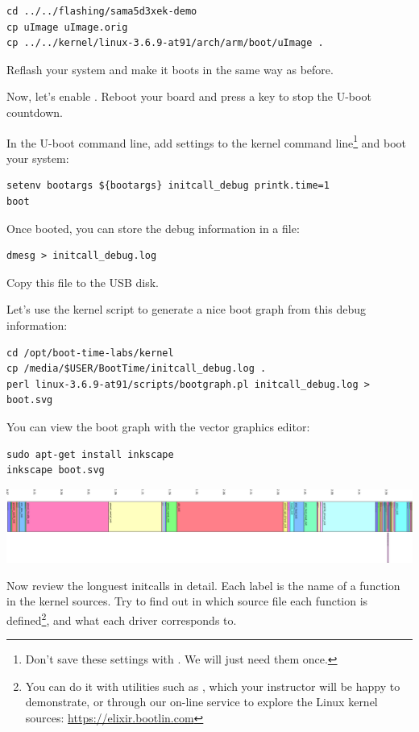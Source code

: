 \begin{verbatim}
cd ../../flashing/sama5d3xek-demo
cp uImage uImage.orig
cp ../../kernel/linux-3.6.9-at91/arch/arm/boot/uImage .
\end{verbatim}

Reflash your system and make it boots in the same way as before.

Now, let's enable . Reboot your board and press
a key to stop the U-boot countdown.

In the U-boot command line, add settings to the kernel command
line\footnote{Don't save these settings with . We
will just need them once.}
and boot your system:
\begin{verbatim}
setenv bootargs ${bootargs} initcall_debug printk.time=1
boot
\end{verbatim}

Once booted, you can store the debug information in a file:

\begin{verbatim}
dmesg > initcall_debug.log
\end{verbatim}

Copy this file to the USB disk.

Let's use the kernel script to generate a nice boot graph
from this debug information:

\begin{verbatim}
cd /opt/boot-time-labs/kernel
cp /media/$USER/BootTime/initcall_debug.log .
perl linux-3.6.9-at91/scripts/bootgraph.pl initcall_debug.log > boot.svg
\end{verbatim}

You can view the boot graph with the  vector graphics
editor:

\begin{verbatim}
sudo apt-get install inkscape
inkscape boot.svg
\end{verbatim}

\begin{center}
\includegraphics[width=\textwidth]{labs/boottime-kernel/boot.png}
\end{center}

Now review the longuest initcalls in detail. Each label is the name of
a function in the kernel sources. Try to find out in which source file
each function is defined\footnote{You can do it with utilities such as
, which your instructor will be happy to demonstrate,
or through our on-line service to explore the Linux kernel sources:
\url{https://elixir.bootlin.com}}, and what each driver corresponds
to.

